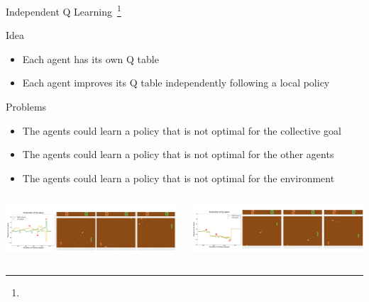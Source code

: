 \documentclass[presentation, 8pt]{beamer}\mode<presentation>{\usetheme{AMSBolognaFC}}
\begin{document}
\begin{frame}{Independent Q Learning~\footnote[frame]{}}
	\begin{alertblock}{Idea}
		\begin{itemize}
			\item Each agent has its own Q table
			\item Each agent improves its Q table independently following a local policy	
		\end{itemize}
	\end{alertblock}
	\begin{exampleblock}{Problems}
		\begin{itemize}
			\item The agents could learn a policy that is not optimal for the collective goal
			\item The agents could learn a policy that is not optimal for the other agents
			\item The agents could learn a policy that is not optimal for the environment
		\end{itemize}
	\end{exampleblock}
	\begin{columns}
		\begin{column}[b]{0.5\textwidth}
			\href{https://www.youtube.com/watch?v=nn6_GUVDnVw&list=PLfLv_F3r0TwyaZPe50OOUx8tRf0HwdR_u&index=2}{
				\includegraphics[width=\textwidth]{img/competitive.png}}
					
		\end{column}
		\begin{column}[b]{0.5\textwidth}
			\href{https://www.youtube.com/watch?v=Gb9DprIgdGw&list=PLfLv_F3r0TwyaZPe50OOUx8tRf0HwdR_u&index=1}{
				\includegraphics[width=\textwidth]{img/cooperative.png}}
					
		\end{column}
	\end{columns}
\end{frame}
\end{document}
